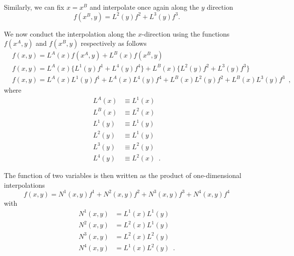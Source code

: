 Similarly, we can fix $x = x^B$ and interpolate once again along the $y$ direction
\[f(x^B,y) = L^2(y)f^2 + L^3(y)f^3.\]

We now conduct the interpolation along the $x$-direction using the functions $f(x^A,y)$ and $f(x^B,y)$ respectively as follows
\begin{align*}
  &f(x,y) = L^A(x) f(x^A,y) + L^B(x)f(x^B,y)\\
  &f(x,y) = L^A(x)\{L^1(y)f^1 + L^4(y)f^4\} + L^B(x)\{L^2(y)f^2 + L^3(y)f^3\}\\
  &f(x,y) = L^A(x)L^1(y)f^1 + L^A(x)L^4(y)f^4 + L^B(x)L^2(y)f^2 + L^B(x)L^3(y)f^3 \enspace ,
\end{align*}
where
\begin{align*}
L^A(x) & \equiv L^1(x)\\
L^B(x) & \equiv L^2(x)\\
L^1(y) & \equiv L^1(y)\\
L^2(y) & \equiv L^1(y)\\
L^3(y) & \equiv L^2(y)\\
L^4(y) & \equiv L^2(x) \enspace .
\end{align*}

The function of two variables is then written as the product of one-dimensional interpolations
\[f(x,y) = N^1(x,y)f^1 + N^2(x,y)f^2 + N^3(x,y)f^3 + N^4(x,y)f^4\]
with
\begin{align*}
N^1(x,y) & = L^1(x)L^1(y)\\
N^2(x,y) & = L^2(x)L^1(y)\\
N^3(x,y) & = L^2(x)L^2(y)\\
N^4(x,y) & = L^1(x)L^2(y) \enspace .
\end{align*}

